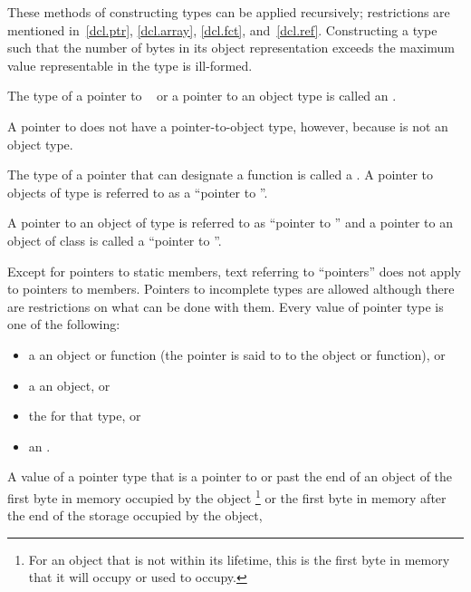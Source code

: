 \pnum
These methods of constructing types can be applied recursively;
restrictions are mentioned in~\ref{dcl.ptr}, \ref{dcl.array},
\ref{dcl.fct}, and~\ref{dcl.ref}. Constructing a type such that the number of
bytes in its object representation exceeds the maximum value representable in
the type  is ill-formed.

\pnum
{}%
The type of a pointer to \cv{}~ or a pointer to an object type is
called an . \begin{note} A pointer to 
does not have a pointer-to-object type, however, because  is not
an object type. \end{note} The type of a pointer that can designate a function
is called a .
A pointer to objects of type  is referred to as a ``pointer to
''. \begin{example} A pointer to an object of type  is
referred to as ``pointer to '' and a pointer to an object of
class  is called a ``pointer to ''. \end{example}
Except for pointers to static members, text referring to ``pointers''
does not apply to pointers to members. Pointers to incomplete types are
allowed although there are restrictions on what can be done with
them.
%
Every value of pointer type is one of the following:
\begin{itemize}
\item
a  an object or function (the pointer is said to  to the object or function), or
\item
a  an object, or
\item
{}
the  for that type, or
\item
{}
an .
\end{itemize}
A value of a
pointer type
that is a pointer to or past the end of an object
 of
the first byte in memory occupied by the object%
\footnote{For an object that is not within its lifetime,
this is the first byte in memory that it will occupy or used to occupy.}
or the first byte in memory
after the end of the storage occupied by the object,
